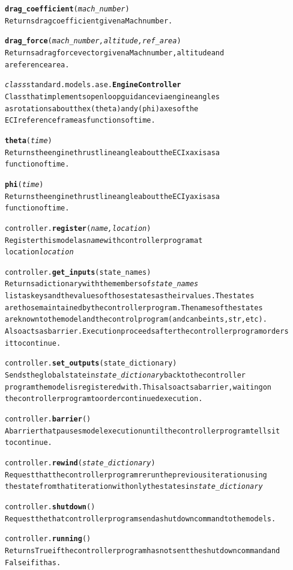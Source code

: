 \documentclass{book}
\begin{document}
\begin{alltt}
  \textbf{drag_coefficient}(\emph{mach_number})
    Returns drag coefficient given a Mach number.

  \textbf{drag_force}(\emph{mach_number, altitude, ref_area})
    Returns a drag force vector given a Mach number, altitude and
    a reference area.

\emph{class} standard.models.ase.\textbf{EngineController}
  Class that implements open loop guidance via engine angles 
  as rotations about the x (theta) and y (phi) axes of the 
  ECI reference frame as functions of time.

  \textbf{theta}(\emph{time})
    Returns the engine thrust line angle about the ECI x axis as a 
    function of time.

  \textbf{phi}(\emph{time})
    Returns the engine thrust line angle about the ECI y axis as a 
    function of time.

controller.\textbf{register}( \emph{name, location} )
  Register this model as \emph{name} with controller program at 
  location \emph{location}

controller.\textbf{get_inputs}( state_names )
  Returns a dictionary with the members of \emph{state_names}
  list as keys and the values of those states as their values. The states
  are those maintained by the controller program. The names of the states
  are known to the model and the control program (and can be ints, str, etc).
  Also acts as barrier. Execution proceeds after the controller program orders 
  it to continue.

controller.\textbf{set_outputs}( state_dictionary )
  Sends the global state in \emph{state_dictionary} back to the controller
  program the model is registered with. This also acts a barrier, waiting on
  the controller program to order continued execution.

controller.\textbf{barrier}()
  A barrier that pauses model execution until the controller program tells it
  to continue.

controller.\textbf{rewind}(\emph{ state_dictionary })
  Request that the controller program rerun the previous iteration using
  the state from that iteration with only the states in \emph{state_dictionary}

controller.\textbf{shutdown}()
  Request the that controller program send a shutdown command to the models.

controller.\textbf{running}()
  Returns True if the controller program has not sent the shutdown command and
  False if it has.

\end{alltt}
\end{document}
